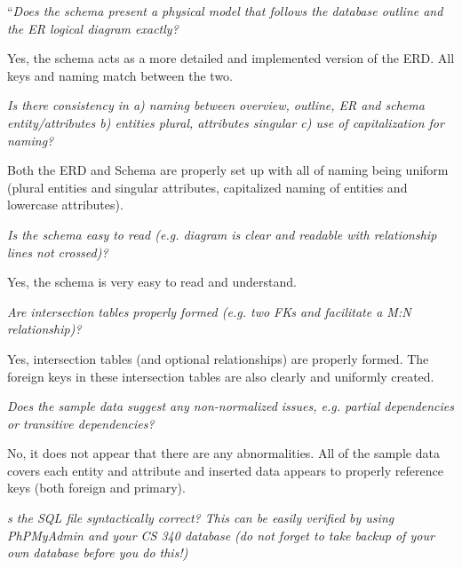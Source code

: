 \documentclass{article}
\begin{document}
\begin{tcolorbox}[colback=secondarycolor, colframe=primarycolor, title=\textbf{Step 2: Peer Review 1 - Joseph Gilmore}]
``\textit{Does the schema present a physical model that follows the database outline and the ER logical diagram exactly?}

\vspace{0.2cm}
Yes, the schema acts as a more detailed and implemented version of the ERD. All keys and naming match between the two.

\vspace{0.2cm}
\textit{Is there consistency in a) naming between overview, outline, ER and schema entity/attributes b) entities plural, attributes singular c) use of capitalization for naming?}

\vspace{0.2cm}
Both the ERD and Schema are properly set up with all of naming being uniform (plural entities and singular attributes, capitalized naming of entities and lowercase attributes).

\vspace{0.2cm}
\textit{Is the schema easy to read (e.g. diagram is clear and readable with relationship lines not crossed)?}

\vspace{0.2cm}
Yes, the schema is very easy to read and understand.

\vspace{0.2cm}
\textit{Are intersection tables properly formed (e.g. two FKs and facilitate a M:N relationship)?}

\vspace{0.2cm}
Yes, intersection tables (and optional relationships) are properly formed. The foreign keys in these intersection tables are also clearly and uniformly created.

\vspace{0.2cm}
\textit{Does the sample data suggest any non-normalized issues, e.g. partial dependencies or transitive dependencies?}

\vspace{0.2cm}
No, it does not appear that there are any abnormalities. All of the sample data covers each entity and attribute and inserted data appears to properly reference keys (both foreign and primary).

\vspace{0.2cm}
\textit{s the SQL file syntactically correct? This can be easily verified by using PhPMyAdmin and your CS 340 database (do not forget to take backup of your own database before you do this!)}


\end{tcolorbox}
\end{document}
